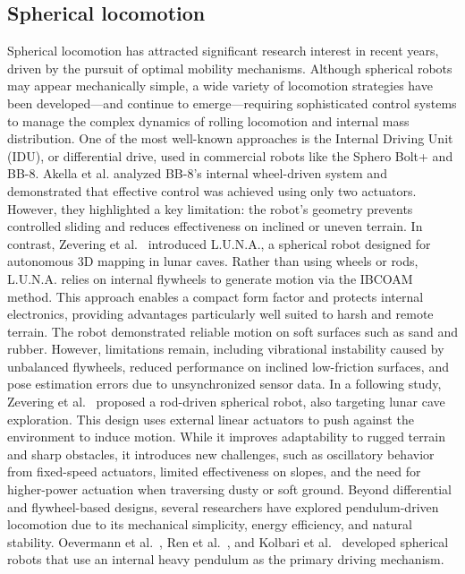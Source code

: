 \documentclass[a4paper, conference]{IEEEtran}
\begin{document}
\subsection{Spherical locomotion}\label{sec:state-of-the-art}
Spherical locomotion has attracted significant research interest in recent years, driven by the pursuit of optimal mobility mechanisms. 
Although spherical robots may appear mechanically simple, a wide variety of locomotion strategies have been developed—and continue to emerge—requiring sophisticated control systems to manage the complex dynamics of rolling locomotion and internal mass distribution.
One of the most well-known approaches is the Internal Driving Unit (IDU), or differential drive, used in commercial robots like the Sphero Bolt+ and BB-8. 
Akella et al.\cite{Sphero} analyzed BB-8’s internal wheel-driven system and demonstrated that effective control was achieved using only two actuators. 
However, they highlighted a key limitation: the robot’s geometry prevents controlled sliding and reduces effectiveness on inclined or uneven terrain.
In contrast, Zevering et al.~\cite{luna} introduced L.U.N.A., a spherical robot designed for autonomous 3D mapping in lunar caves. 
Rather than using wheels or rods, L.U.N.A. relies on internal flywheels to generate motion via the IBCOAM method. 
This approach enables a compact form factor and protects internal electronics, providing advantages particularly well suited to harsh and remote terrain. 
The robot demonstrated reliable motion on soft surfaces such as sand and rubber. 
However, limitations remain, including vibrational instability caused by unbalanced flywheels, reduced performance on inclined low-friction surfaces, and pose estimation errors due to unsynchronized sensor data.
In a following study, Zevering et al.~\cite{rod_sphere} proposed a rod-driven spherical robot, also targeting lunar cave exploration. 
This design uses external linear actuators to push against the environment to induce motion. 
While it improves adaptability to rugged terrain and sharp obstacles, it introduces new challenges, such as oscillatory behavior from fixed-speed actuators, limited effectiveness on slopes, and the need for higher-power actuation when traversing dusty or soft ground.
Beyond differential and flywheel-based designs, several researchers have explored pendulum-driven locomotion due to its mechanical simplicity, energy efficiency, and natural stability. 
Oevermann et al.~\cite{roboball}, Ren et al.~\cite{novelsphere}, and Kolbari et al.~\cite{pendulum_sphere} developed spherical robots that use an internal heavy pendulum as the primary driving mechanism. 
\end{document}
